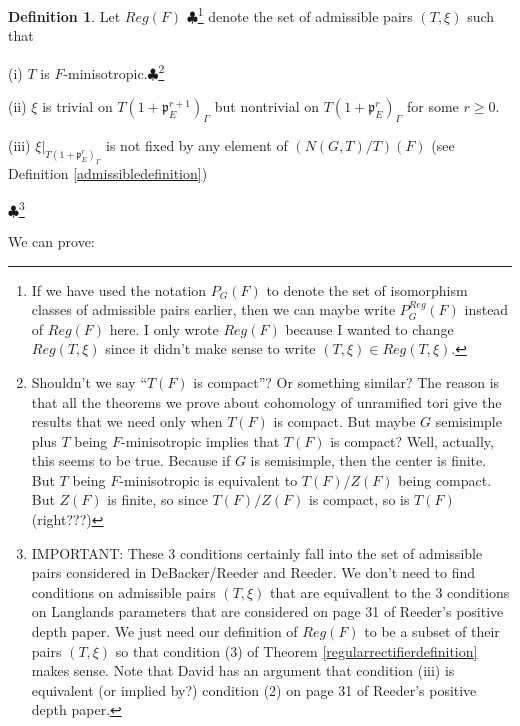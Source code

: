 \documentclass[11pt]{amsart}
\theoremstyle{plain}
\newcommand{\MAxxx}[1]{$\clubsuit$\footnote{#1}}
\theoremstyle{definition}
\newtheorem{definition}[theorem]{Definition}
\begin{document}
\begin{definition}\label{regularpairs}
Let $Reg(F)$ \MAxxx{If we have used the notation $P_G(F)$ to denote
the set of isomorphism classes of admissible pairs earlier, then we can maybe
write $P_G^{Reg}(F)$ instead of $Reg(F)$ here.  I only wrote $Reg(F)$ because
I wanted to change $Reg(T,\xi)$ since it didn't make sense to write
$(T,\xi) \in Reg(T,\xi)$.} denote the set of admissible pairs $(T,\xi)$ such that

(i) $T$ is $F$-minisotropic.\MAxxx{Shouldn't we say ``$T(F)$ is compact''?  Or something
similar?  The reason is that all the theorems we prove about cohomology of unramified tori
give the results that we need only when $T(F)$ is compact.  But maybe $G$ semisimple plus
$T$ being $F$-minisotropic implies that $T(F)$ is compact?  Well, actually, this seems
to be true. Because if $G$ is semisimple, then the center is finite.  But $T$ being
$F$-minisotropic is equivalent to $T(F) / Z(F)$ being compact.  But $Z(F)$ is finite, so
since $T(F) / Z(F)$ is compact, so is $T(F)$  (right???)}

(ii) $\xi$ is trivial on $T(1+\mathfrak{p}_E^{r+1})_{\Gamma}$ but nontrivial on
$T(1+\mathfrak{p}_E^{r})_{\Gamma}$ for some $r \geq 0$.

(iii) $\xi|_{T(1+\mathfrak{p}_E^{r})_{\Gamma}}$ is not fixed by any element of
$(N(G,T)/T)(F)$ (see Definition \ref{admissibledefinition})
\end{definition}
\MAxxx{IMPORTANT: These 3 conditions certainly fall into the set of admissible pairs considered in DeBacker/Reeder and Reeder.  We don't need to find conditions on admissible pairs $(T,\xi)$ that are equivallent to the 3 conditions on Langlands parameters that are considered on page 31 of Reeder's positive depth paper.  We just need our definition of $Reg(F)$ to be a subset of their pairs $(T,\xi)$ so that condition (3) of Theorem \ref{regularrectifierdefinition} makes sense. Note that David has an argument that condition (iii) is equivalent (or implied by?) condition (2) on page 31 of Reeder's positive depth paper.}

We can prove:
\end{document}
